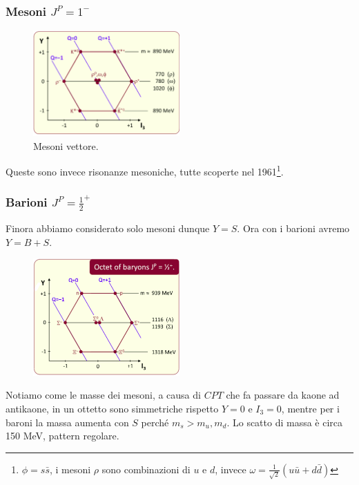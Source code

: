 \subsubsection{Mesoni $J^P=1^-$}
\begin{figure}[H]
    \centering
    \includegraphics[width=0.5\textwidth]{immagini/fig_mesoni_1_meno.png}
    \caption{Mesoni vettore.}
  \end{figure}
  Queste sono invece risonanze mesoniche, tutte scoperte nel 1961\footnote{$\phi=s\bar s$, i mesoni $\rho$ sono combinazioni di $u$ e $d$, invece $\omega=\frac1{\sqrt2}(u\bar u+ d\bar d)$}.
\subsubsection{Barioni $J^P=\frac12^+$}
Finora abbiamo considerato solo mesoni dunque $Y=S$. Ora con i barioni avremo $Y=B+S$. 
\begin{figure}[H]
    \centering
    \includegraphics[width=0.5\textwidth]{immagini/fig_baryon_12_piu.png}
\end{figure}
Notiamo come le masse dei mesoni, a causa di $CPT$ che fa passare da kaone ad antikaone, in un ottetto sono simmetriche rispetto $Y=0$ e $I_3=0$, mentre per i baroni la massa aumenta con $S$ perché $m_s>m_u,m_d$. Lo scatto di massa è circa 150 MeV, pattern regolare.
